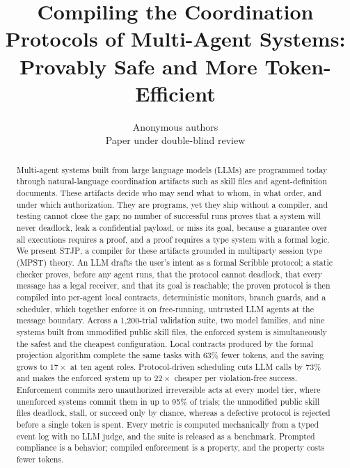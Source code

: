 \documentclass{article}
\title{\bf Compiling the Coordination Protocols of Multi-Agent Systems:\\ Provably Safe and More Token-Efficient}
\author{Anonymous authors\\ \small Paper under double-blind review}
\date{}
\newcommand{\stjp}{\textsc{STJP}}
\begin{document}
\maketitle

\begin{abstract}
Multi-agent systems built from large language models (LLMs) are programmed today through natural-language coordination artifacts such as skill files and agent-definition documents. These artifacts decide who may send what to whom, in what order, and under which authorization. They are programs, yet they ship without a compiler, and testing cannot close the gap; no number of successful runs proves that a system will never deadlock, leak a confidential payload, or miss its goal, because a guarantee over all executions requires a proof, and a proof requires a type system with a formal logic. We present \stjp{}, a compiler for these artifacts grounded in multiparty session type (MPST) theory. An LLM drafts the user's intent as a formal Scribble protocol; a static checker proves, before any agent runs, that the protocol cannot deadlock, that every message has a legal receiver, and that its goal is reachable; the proven protocol is then compiled into per-agent local contracts, deterministic monitors, branch guards, and a scheduler, which together enforce it on free-running, untrusted LLM agents at the message boundary. Across a 1{,}200-trial validation suite, two model families, and nine systems built from unmodified public skill files, the enforced system is simultaneously the safest and the cheapest configuration. Local contracts produced by the formal projection algorithm complete the same tasks with 63\% fewer tokens, and the saving grows to $17\times$ at ten agent roles. Protocol-driven scheduling cuts LLM calls by 73\% and makes the enforced system up to $22\times$ cheaper per violation-free success. Enforcement commits zero unauthorized irreversible acts at every model tier, where unenforced systems commit them in up to 95\% of trials; the unmodified public skill files deadlock, stall, or succeed only by chance, whereas a defective protocol is rejected before a single token is spent. Every metric is computed mechanically from a typed event log with no LLM judge, and the suite is released as a benchmark. Prompted compliance is a behavior; compiled enforcement is a property, and the property costs fewer tokens.
\end{abstract}
\end{document}
